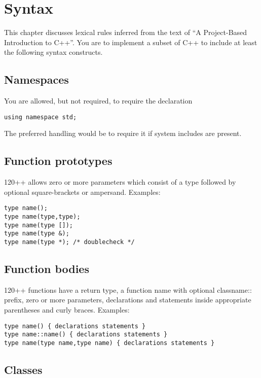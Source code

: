 \chapter{Syntax}

This chapter discusses lexical rules inferred from the text of ``A
Project-Based Introduction to C++''.  You are to implement a subset
of C++ to include at least the following syntax constructs.

\section{Namespaces}

You are allowed, but not required, to require the declaration
\begin{verbatim}
using namespace std;
\end{verbatim}

The preferred handling would be to require it if system includes are present.

\section{Function prototypes}

120++ allows zero or more parameters which consist of a type followed
by optional square-brackets or ampersand.  Examples:

\begin{verbatim}
type name();
type name(type,type);
type name(type []);
type name(type &);
type name(type *); /* doublecheck */
\end{verbatim}

\section{Function bodies}

120++ functions have a return type, a function name with optional
classname:: prefix, zero or more parameters, declarations and
statements inside appropriate parentheses and curly braces. Examples:

\begin{verbatim}
type name() { declarations statements }
type name::name() { declarations statements }
type name(type name,type name) { declarations statements }
\end{verbatim}

\section{Classes}

